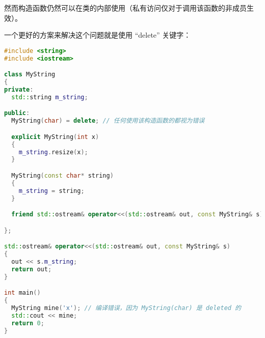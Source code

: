 \documentclass[../../LearnCpp.tex]{subfiles}
\begin{document}
然而构造函数仍然可以在类的内部使用（私有访问仅对于调用该函数的非成员生效）。

一个更好的方案来解决这个问题就是使用 “delete” 关键字：

\begin{lstlisting}[language=C++]
#include <string>
#include <iostream>

class MyString
{
private:
  std::string m_string;

public:
  MyString(char) = delete; // 任何使用该构造函数的都视为错误

  explicit MyString(int x)
  {
    m_string.resize(x);
  }

  MyString(const char* string)
  {
    m_string = string;
  }

  friend std::ostream& operator<<(std::ostream& out, const MyString& s);

};

std::ostream& operator<<(std::ostream& out, const MyString& s)
{
  out << s.m_string;
  return out;
}

int main()
{
  MyString mine('x'); // 编译错误，因为 MyString(char) 是 deleted 的
  std::cout << mine;
  return 0;
}
\end{lstlisting}
\end{document}
